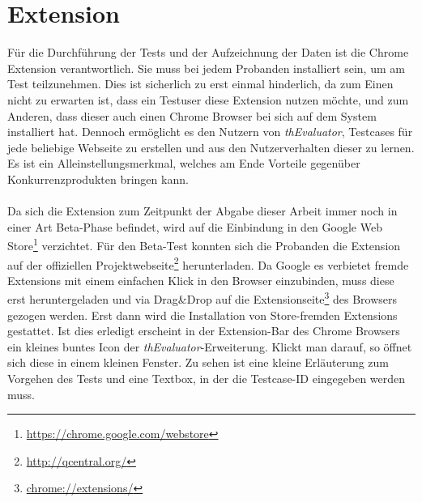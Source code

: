 %
%
%
%


\section{Extension}

Für die Durchführung der Tests und der Aufzeichnung der Daten ist die Chrome Extension verantwortlich. Sie muss bei jedem Probanden installiert sein, um am Test teilzunehmen. Dies ist sicherlich zu erst einmal hinderlich, da zum Einen nicht zu erwarten ist, dass ein Testuser diese Extension nutzen möchte, und zum Anderen, dass dieser auch einen Chrome Browser bei sich auf dem System installiert hat. Dennoch ermöglicht es den Nutzern von \textit{thEvaluator}, Testcases für jede beliebige Webseite zu erstellen und aus den Nutzerverhalten dieser zu lernen. Es ist ein Alleinstellungsmerkmal, welches am Ende Vorteile gegenüber Konkurrenzprodukten bringen kann.\\
\\
Da sich die Extension zum Zeitpunkt der Abgabe dieser Arbeit immer noch in einer Art Beta-Phase befindet, wird auf die Einbindung in den Google Web Store\footnote{\url{https://chrome.google.com/webstore}} verzichtet. Für den Beta-Test konnten sich die Probanden die Extension auf der offiziellen Projektwebseite\footnote{\url{http://qcentral.org/}} herunterladen. Da Google es verbietet fremde Extensions mit einem einfachen Klick in den Browser einzubinden, muss diese erst heruntergeladen und via Drag\&Drop auf die Extensionseite\footnote{\url{chrome://extensions/}} des Browsers gezogen werden. Erst dann wird die Installation von Store-fremden Extensions gestattet. Ist dies erledigt erscheint in der Extension-Bar des Chrome Browsers ein kleines buntes Icon der \textit{thEvaluator}-Erweiterung. Klickt man darauf, so öffnet sich diese in einem kleinen Fenster. Zu sehen ist eine kleine Erläuterung zum Vorgehen des Tests und eine Textbox, in der die Testcase-ID eingegeben werden muss.

